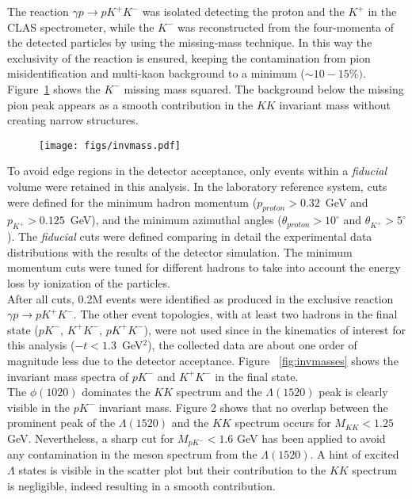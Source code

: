\documentclass[twocolumn,superscriptaddress,prd]{revtex4}
\begin{document}
The reaction $\gamma p \to p K^+ K^-$ was isolated detecting the  proton and the $K^+$ in the CLAS spectrometer,
while the  $K^-$ was reconstructed from the four-momenta of the detected particles by using the missing-mass technique.
In this way the exclusivity of the reaction is ensured,  
keeping the contamination from pion misidentification and   multi-kaon  background to a minimum ($\sim10-15\%)$. Figure~\ref{fig:pid}
shows the $K^-$ missing mass squared.
The  background below the missing pion peak appears as a smooth contribution 
in the $KK$ invariant mass without creating narrow structures.
\begin{figure}[h!] 
\center
\texttt{[image: figs/invmass.pdf]} 
\caption{\label{fig:pid}}
\end{figure}
To avoid  edge regions in the  detector acceptance, only events within a {\it fiducial} volume were retained in this analysis.
In the laboratory reference system, cuts were defined for
the minimum hadron momentum ($p_{proton}>0.32$~GeV and $p_{K^+}>0.125$~GeV), and the minimum  
azimuthal angles ($\theta_{proton} >10^\circ$ and $\theta_{K^+} >5^\circ$). 
The  {\it fiducial} cuts  were defined comparing in detail the experimental data distributions with the results of  the detector  simulation.
The minimum momentum cuts were tuned for different hadrons to take into account the energy loss by ionization of the particles.\\
After all cuts, 0.2M  events were identified as produced in the exclusive reaction   $\gamma p \to p K^+ K^-$.
The other event topologies, with at least two hadrons in the final state ($p K^-$, $K^+K^-$,
$p K^+  K^-$), were not used since in the kinematics of interest for this analysis ($-t<1.3$~GeV$^2$),
the collected data are  about one  order of magnitude less due to the detector acceptance.
Figure ~\ref{fig:invmasses} shows the invariant mass spectra of $pK^-$ and $K^+K^-$ in the final state.\\
The $\phi(1020)$ dominates the $K K$ spectrum and  the $\Lambda(1520)$ peak is clearly visible in the $p K^-$
invariant mass. Figure 2 shows  that no overlap between the prominent peak of the $\Lambda(1520)$ and the $K K$ spectrum occurs for 
$M_{KK}<1.25$ GeV. Nevertheless, a sharp cut for $M_{pK^-}<1.6$ GeV has been applied to avoid any contamination in the meson spectrum from the    $\Lambda(1520)$.
A hint of excited $\Lambda$ states is visible in the scatter plot but their contribution to the $KK$ spectrum is negligible, indeed resulting in a smooth contribution. 
\end{document}
